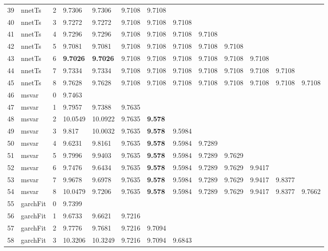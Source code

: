 \documentclass[10pt,a4paper]{article}
\begin{document}
\begin{table}[ht]
\begin{tabular}{rlrllllllllll}
  39 & nnetTs &     2 & 9.7306 & 9.7306 & 9.7108 & 9.7108 &  &  &  &  &  &  \\ 
  40 & nnetTs &     3 & 9.7272 & 9.7272 & 9.7108 & 9.7108 & 9.7108 &  &  &  &  &  \\ 
  41 & nnetTs &     4 & 9.7296 & 9.7296 & 9.7108 & 9.7108 & 9.7108 & 9.7108 &  &  &  &  \\ 
  42 & nnetTs &     5 & 9.7081 & 9.7081 & 9.7108 & 9.7108 & 9.7108 & 9.7108 & 9.7108 &  &  &  \\ 
  43 & nnetTs &     6 & \textbf{9.7026} & \textbf{9.7026} & 9.7108 & 9.7108 & 9.7108 & 9.7108 & 9.7108 & 9.7108 &  &  \\ 
  44 & nnetTs &     7 & 9.7334 & 9.7334 & 9.7108 & 9.7108 & 9.7108 & 9.7108 & 9.7108 & 9.7108 & 9.7108 &  \\ 
  45 & nnetTs &     8 & 9.7628 & 9.7628 & 9.7108 & 9.7108 & 9.7108 & 9.7108 & 9.7108 & 9.7108 & 9.7108 & 9.7108 \\ 
   \hline
46 & msvar &     0 & 9.7463 &  &  &  &  &  &  &  &  &  \\ 
  47 & msvar &     1 & 9.7957 & 9.7388 & 9.7635 &  &  &  &  &  &  &  \\ 
  48 & msvar &     2 & 10.0549 & 10.0922 & 9.7635 & \textbf{9.578} &  &  &  &  &  &  \\ 
  49 & msvar &     3 & 9.817 & 10.0032 & 9.7635 & \textbf{9.578} & 9.5984 &  &  &  &  &  \\ 
  50 & msvar &     4 & 9.6231 & 9.8161 & 9.7635 & \textbf{9.578} & 9.5984 & 9.7289 &  &  &  &  \\ 
  51 & msvar &     5 & 9.7996 & 9.9403 & 9.7635 & \textbf{9.578} & 9.5984 & 9.7289 & 9.7629 &  &  &  \\ 
  52 & msvar &     6 & 9.7476 & 9.6434 & 9.7635 & \textbf{9.578} & 9.5984 & 9.7289 & 9.7629 & 9.9417 &  &  \\ 
  53 & msvar &     7 & 9.9678 & 9.6978 & 9.7635 & \textbf{9.578} & 9.5984 & 9.7289 & 9.7629 & 9.9417 & 9.8377 &  \\ 
  54 & msvar &     8 & 10.0479 & 9.7206 & 9.7635 & \textbf{9.578} & 9.5984 & 9.7289 & 9.7629 & 9.9417 & 9.8377 & 9.7662 \\ 
   \hline
55 & garchFit &     0 & 9.7399 &  &  &  &  &  &  &  &  &  \\ 
  56 & garchFit &     1 & 9.6733 & 9.6621 & 9.7216 &  &  &  &  &  &  &  \\ 
  57 & garchFit &     2 & 9.7776 & 9.7681 & 9.7216 & 9.7094 &  &  &  &  &  &  \\ 
  58 & garchFit &     3 & 10.3206 & 10.3249 & 9.7216 & 9.7094 & 9.6843 &  &  &  &  &  \\ 

\end{tabular}
\end{table}
\end{document}
